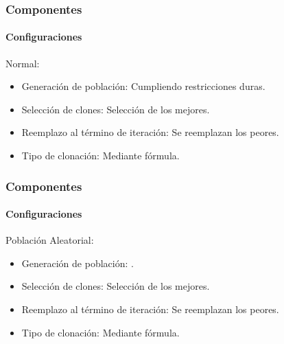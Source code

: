 \frame
{
\frametitle{Componentes}
\framesubtitle{Configuraciones}
Normal:
        \begin{itemize}
            \item Generación de población: Cumpliendo restricciones duras.
            \item Selección de clones: Selección de los mejores.
            \item Reemplazo al término de iteración:  Se reemplazan los peores.
            \item Tipo de clonación: Mediante fórmula.
        \end{itemize}
}


\frame
{
\frametitle{Componentes}
\framesubtitle{Configuraciones}
Población Aleatorial:
        \begin{itemize}
            \item Generación de población: .
            \item Selección de clones: Selección de los mejores.
            \item Reemplazo al término de iteración:  Se reemplazan los peores.
            \item Tipo de clonación: Mediante fórmula.
        \end{itemize}
}

